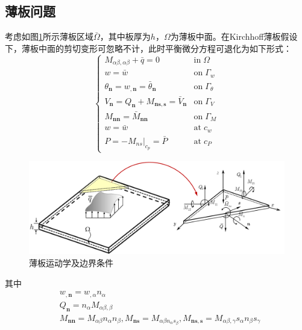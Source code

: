 \subsection{薄板问题}
考虑如图\ref{plate}所示薄板区域$\bar \Omega$，其中板厚为$h$，$\Omega$为薄板中面。在Kirchhoff薄板假设下\cite{ventsel2002}，薄板中面的剪切变形可忽略不计，此时平衡微分方程可退化为如下形式：
\begin{equation}
    \begin{cases}\label{P control equation}
        M_{\alpha\beta,\alpha\beta}+\bar q=0&\mathrm{in} \; \Omega\\
        w=\bar w&\mathrm{on}\;\Gamma_w\\
        \theta_{\pmb n}=w_{,\pmb n}=\bar \theta_{\pmb n}&\mathrm{on}\;\Gamma_{\theta}\\
        V_{\pmb n}=Q_{\pmb n}+M_{\pmb{ns},\pmb s}=\bar V_{\pmb n}&\mathrm{on}\;\Gamma_V\\
        M_{\pmb{nn}}=\bar M_{\pmb{nn}}&\mathrm{on}\; \Gamma_M\\
        w=\bar w&\mathrm{at} \; c_w\\
        P=-\left .M_{ns} \right \vert_{c_p}=\bar P&\mathrm{at}\; c_P
    \end{cases}
\end{equation}
\begin{figure}[H]
    \centering
    \includegraphics[scale=0.7]{figure/nomesh/plate.png}
    \caption{薄板运动学及边界条件}\label{plate}
\end{figure}
\noindent
其中
\begin{subequations}
\begin{align}
\label{wn} &w_{,\pmb n}=w_{,\alpha}n_{\alpha}\\
\label{Qn} &Q_{\pmb n}=n_{\alpha}M_{\alpha\beta,\beta}\\
\label{Mn} &M_{\pmb{nn}}=M_{\alpha\beta}n_{\alpha}n_{\beta},M_{\pmb{ns}}=M_{\alpha\beta n_{\alpha}s_{\beta}},M_{\pmb{ns,s}}=M_{\alpha\beta,\gamma}s_{\alpha}n_{\beta}s_{\gamma}
\end{align}
\end{subequations}
